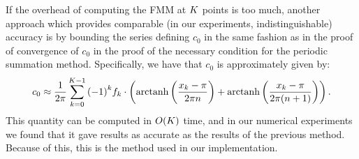 If the overhead of computing the FMM at $K$ points is too
much, another approach which provides comparable (in our experiments,
indistinguishable) accuracy is by bounding the series defining $c_0$
in the same fashion as in the proof of convergence of $c_0$ in the
proof of the necessary condition for the periodic summation
method. Specifically, we have that $c_0$ is approximately given by:
\begin{align}
  \label{eq:c0-arctanh}
  c_0 \approx \frac{1}{2\pi} \sum_{{k{}}=0}^{K{}-1} {(-1)}^k {f}_{k} \cdot \left(\operatorname{arctanh}\left(\frac{{x}_{k}-\pi}{2\pi n}\right) + \operatorname{arctanh}\left(\frac{{x}_{k}-\pi}{2\pi(n + 1)}\right)\right).
\end{align}
This quantity can be computed in $O(K)$ time, and in our
numerical experiments we found that it gave results as accurate as the
results of the previous method. Because of this, this is the method
used in our implementation.


